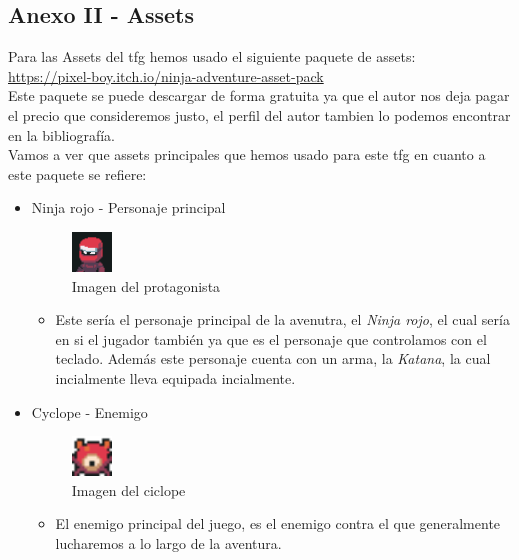 \documentclass[a4paper]{article}
\begin{document}
\begin{appendices}
    \section{Anexo II - Assets}
    Para las Assets del tfg hemos usado el siguiente paquete de assets: \\
    \url{https://pixel-boy.itch.io/ninja-adventure-asset-pack} \\
    Este paquete se puede descargar de forma gratuita ya que el autor nos deja pagar el precio que consideremos justo, el perfil del autor tambien lo podemos encontrar en la bibliografía. \\
    Vamos a ver que assets principales que hemos usado para este tfg en cuanto a este paquete se refiere:
    \begin{itemize}
        \item Ninja rojo - Personaje principal
        \begin{figure}[ht]
            \centering
            \includegraphics[width=0.1\textwidth]{Images/FacesetPlayer.png}
            \caption{Imagen del protagonista}
            \label{fig:player}
        \end{figure}
        \begin{itemize}
            \item Este sería el personaje principal de la avenutra, el \textit{Ninja rojo}, el cual sería en si el jugador también ya que es el personaje que controlamos con el teclado. Además este
            personaje cuenta con un arma, la \textit{Katana}, la cual incialmente lleva equipada incialmente.
        \end{itemize}
        \item Cyclope - Enemigo
        \begin{figure}[ht]
            \centering
            \includegraphics[width=0.1\textwidth]{Images/monster1.png}
            \caption{Imagen del ciclope}
            \label{fig:player}
        \end{figure}
        \begin{itemize}
            \item El enemigo principal del juego, es el enemigo contra el que generalmente lucharemos a lo largo de la aventura.

\end{itemize}
\end{itemize}
\end{appendices}
\end{document}
